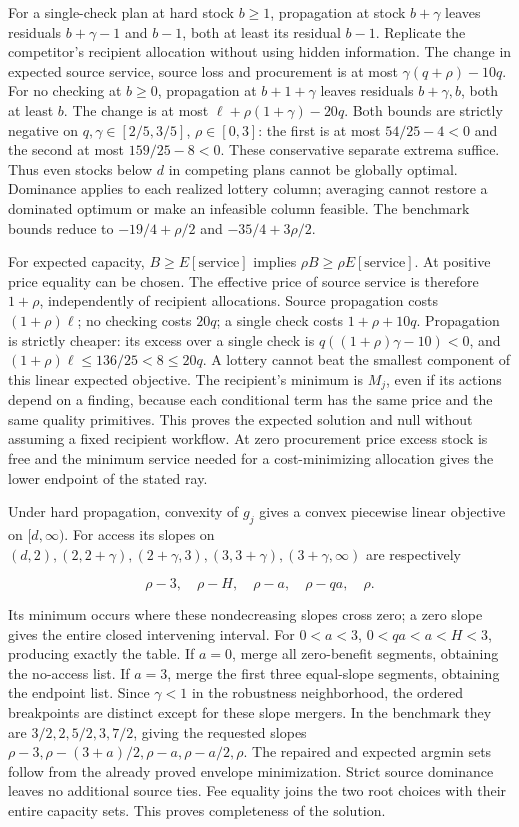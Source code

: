 \documentclass[
  11pt,
  a4paper,
]{article}
\begin{document}
For a single-check plan at hard stock \(b\geq1\), propagation at stock
\(b+\gamma\) leaves residuals \(b+\gamma-1\) and \(b-1\), both at least
its residual \(b-1\). Replicate the competitor's recipient allocation
without using hidden information. The change in expected source service,
source loss and procurement is at most \(\gamma(q+\rho)-10q\). For no
checking at \(b\geq0\), propagation at \(b+1+\gamma\) leaves residuals
\(b+\gamma,b\), both at least \(b\). The change is at most
\(\ell+\rho(1+\gamma)-20q\). Both bounds are strictly negative on
\(q,\gamma\in[2/5,3/5]\), \(\rho\in[0,3]\): the first is at most
\(54/25-4<0\) and the second at most \(159/25-8<0\). These conservative
separate extrema suffice. Thus even stocks below \(d\) in competing
plans cannot be globally optimal. Dominance applies to each realized
lottery column; averaging cannot restore a dominated optimum or make an
infeasible column feasible. The benchmark bounds reduce to
\(-19/4+\rho/2\) and \(-35/4+3\rho/2\).

For expected capacity, \(B\geq E[\text{service}]\) implies
\(\rho B\geq\rho E[\text{service}]\). At positive price equality can be
chosen. The effective price of source service is therefore \(1+\rho\),
independently of recipient allocations. Source propagation costs
\((1+\rho)\ell\); no checking costs \(20q\); a single check costs
\(1+\rho+10q\). Propagation is strictly cheaper: its excess over a
single check is \(q((1+\rho)\gamma-10)<0\), and
\((1+\rho)\ell\leq136/25<8\leq20q\). A lottery cannot beat the smallest
component of this linear expected objective. The recipient's minimum is
\(M_j\), even if its actions depend on a finding, because each
conditional term has the same price and the same quality primitives.
This proves the expected solution and null without assuming a fixed
recipient workflow. At zero procurement price excess stock is free and
the minimum service needed for a cost-minimizing allocation gives the
lower endpoint of the stated ray.

Under hard propagation, convexity of \(g_j\) gives a convex piecewise
linear objective on \([d,\infty)\). For access its slopes on
\((d,2),(2,2+\gamma),(2+\gamma,3),(3,3+\gamma),(3+\gamma,\infty)\) are
respectively

\[\rho-3,\quad\rho-H,\quad\rho-a,\quad\rho-qa,\quad\rho.\tag{65}\]

Its minimum occurs where these nondecreasing slopes cross zero; a zero
slope gives the entire closed intervening interval. For \(0<a<3\),
\(0<qa<a<H<3\), producing exactly the table. If \(a=0\), merge all
zero-benefit segments, obtaining the no-access list. If \(a=3\), merge
the first three equal-slope segments, obtaining the endpoint list. Since
\(\gamma<1\) in the robustness neighborhood, the ordered breakpoints are
distinct except for these slope mergers. In the benchmark they are
\(3/2,2,5/2,3,7/2\), giving the requested slopes
\(\rho-3,\rho-(3+a)/2,\rho-a,\rho-a/2,\rho\). The repaired and expected
argmin sets follow from the already proved envelope minimization. Strict
source dominance leaves no additional source ties. Fee equality joins
the two root choices with their entire capacity sets. This proves
completeness of the solution.
\end{document}
